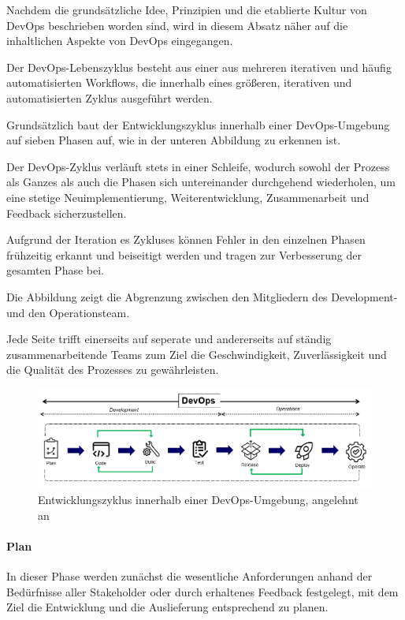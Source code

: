 Nachdem die grundsätzliche Idee, Prinzipien und die etablierte Kultur von DevOps beschrieben worden sind, wird in diesem Absatz näher auf die inhaltlichen Aspekte von DevOps eingegangen.

Der DevOps-Lebenszyklus besteht aus einer aus mehreren iterativen und häufig automatisierten Workflows, die innerhalb eines größeren, iterativen und automatisierten Zyklus ausgeführt werden.

Grundsätzlich baut der Entwicklungszyklus innerhalb einer DevOps-Umgebung auf sieben Phasen auf, wie in der unteren Abbildung zu erkennen ist.

Der DevOps-Zyklus verläuft stets in einer Schleife, wodurch sowohl der Prozess als Ganzes als auch die Phasen sich untereinander durchgehend wiederholen, um eine stetige Neuimplementierung, Weiterentwicklung, Zusammenarbeit und Feedback sicherzustellen. 

Aufgrund der Iteration es Zykluses können Fehler in den einzelnen Phasen frühzeitig erkannt und beiseitigt werden und tragen zur Verbesserung der gesamten Phase bei. 

Die Abbildung zeigt die Abgrenzung zwischen den Mitgliedern des Development- und den Operationsteam.

Jede Seite trifft einerseits auf seperate und andererseits auf ständig zusammenarbeitende Teams zum Ziel die Geschwindigkeit, Zuverlässigkeit und die Qualität des Prozesses zu gewährleisten. 

\begin{figure}[h]
    \centering
    \includegraphics[scale=0.6]{Bilder/DevOps Lebenszyklus.png}
    \caption{Entwicklungszyklus innerhalb einer DevOps-Umgebung, angelehnt an \cite[S. 16]{halstenberg_devops_2020}}
\end{figure}
\paragraph{Plan}
In dieser Phase werden zunächst die wesentliche Anforderungen anhand der Bedürfnisse aller Stakeholder oder durch erhaltenes Feedback festgelegt, mit dem Ziel die Entwicklung und die Auslieferung entsprechend zu planen. \cite[s. 16]{halstenberg_devops_2020}  

